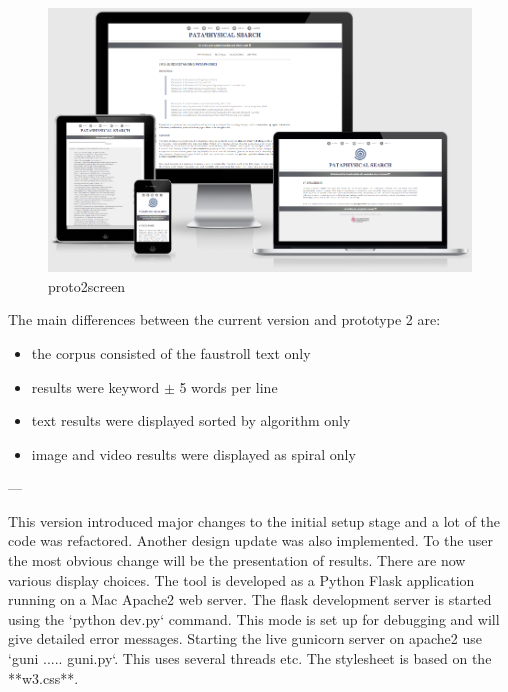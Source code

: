 \begin{figure}[htb] %
  \centering
  \includegraphics[width=\linewidth]{images/proto2screen}
\caption[proto2screen]{proto2screen}
\label{img:proto2screen}
\end{figure}

The main differences between the current version and prototype 2 are:
\begin{itemize}
  \item the corpus consisted of the faustroll text only
  \item results were keyword $\pm$ 5 words per line
  \item text results were displayed sorted by algorithm only
  \item image and video results were displayed as spiral only
\end{itemize}

---

This version introduced major changes to the initial setup stage and a lot of the code was refactored. Another design update was also implemented. To the user the most obvious change will be the presentation of results. There are now various display choices. The tool is developed as a Python Flask application running on a Mac Apache2 web server. The flask development server is started using the `python dev.py` command. This mode is set up for debugging and will give detailed error messages. Starting the live gunicorn server on apache2 use `guni ..... guni.py`. This uses several threads etc. The stylesheet is based on the **w3.css**.


\stopcontents[chapters]
